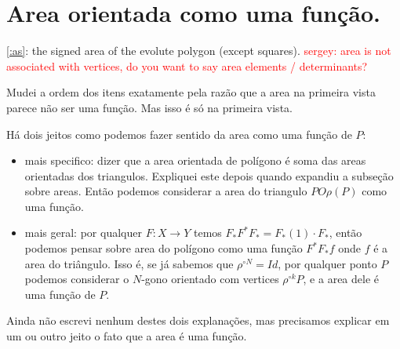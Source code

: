 \section{Area orientada como uma função.}

\eqref{:as}: the signed area of the evolute polygon (except squares).
\textcolor{red}{sergey: area is not associated with vertices, do you want to say area elements / determinants?}
{Mudei a ordem dos itens exatamente pela razão que a area na primeira vista parece não ser uma função. Mas isso é só na primeira vista.

Há dois jeitos como podemos fazer sentido da area como uma função de $P$:

\begin{itemize}
\item mais specifico: dizer que a area orientada de polígono é soma das areas orientadas dos triangulos.
Expliquei este depois quando expandiu a subseção sobre areas.
Então podemos considerar a area do triangulo $POρ(P)$ como uma função.

\item mais geral: por qualquer $F: X\to Y$ temos $F_* F^* F_* = F_*(1)\cdot F_*$,
então podemos pensar sobre area do polígono como uma função $F^* F_* f$ onde $f$ é a area do triângulo.
Isso é, se já sabemos que $ρ^{\circ N} = Id$,
por qualquer ponto $P$ podemos considerar o $N$-gono orientado com vertices $ρ^{\circ k} P$,
e a area dele é uma função de $P$.
\end{itemize}

Ainda não escrevi nenhum destes dois explanações, mas precisamos explicar em um ou outro jeito o fato que
a area é uma função.
}
